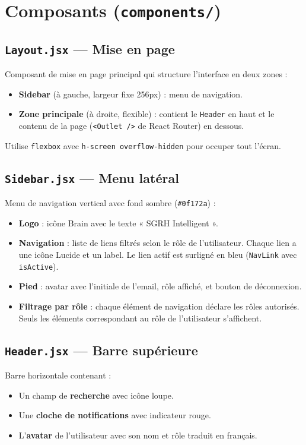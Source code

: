 \documentclass[a4paper,12pt]{report}
\begin{document}
\section{Composants (\texttt{components/})}

\subsection{\texttt{Layout.jsx} --- Mise en page}
Composant de mise en page principal qui structure l'interface en deux zones :
\begin{itemize}
  \item \textbf{Sidebar} (à gauche, largeur fixe 256px) : menu de navigation.
  \item \textbf{Zone principale} (à droite, flexible) : contient le \texttt{Header} en haut et le contenu de la page (\texttt{<Outlet />} de React Router) en dessous.
\end{itemize}
Utilise \texttt{flexbox} avec \texttt{h-screen overflow-hidden} pour occuper tout l'écran.

\subsection{\texttt{Sidebar.jsx} --- Menu latéral}
Menu de navigation vertical avec fond sombre (\texttt{\#0f172a}) :
\begin{itemize}
  \item \textbf{Logo} : icône Brain avec le texte « SGRH Intelligent ».
  \item \textbf{Navigation} : liste de liens filtrés selon le rôle de l'utilisateur. Chaque lien a une icône Lucide et un label. Le lien actif est surligné en bleu (\texttt{NavLink} avec \texttt{isActive}).
  \item \textbf{Pied} : avatar avec l'initiale de l'email, rôle affiché, et bouton de déconnexion.
  \item \textbf{Filtrage par rôle} : chaque élément de navigation déclare les rôles autorisés. Seuls les éléments correspondant au rôle de l'utilisateur s'affichent.
\end{itemize}

\subsection{\texttt{Header.jsx} --- Barre supérieure}
Barre horizontale contenant :
\begin{itemize}
  \item Un champ de \textbf{recherche} avec icône loupe.
  \item Une \textbf{cloche de notifications} avec indicateur rouge.
  \item L'\textbf{avatar} de l'utilisateur avec son nom et rôle traduit en français.
\end{itemize}
\end{document}
